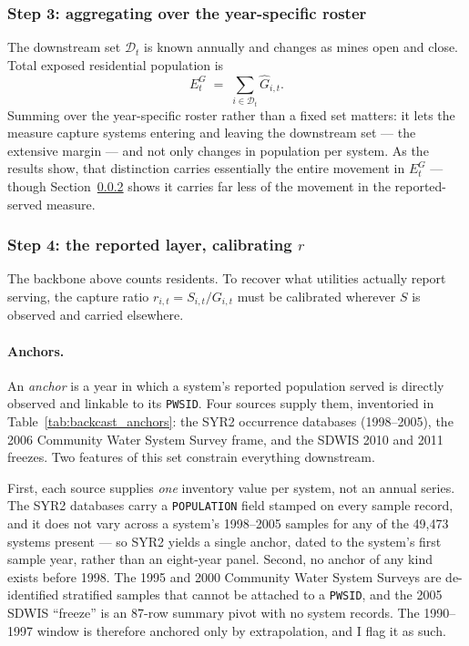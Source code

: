 \subsubsection{Step 3: aggregating over the year-specific roster}

The downstream set $\mathcal{D}_t$ is known annually and changes as mines open
and close. Total exposed residential population is
%
\begin{equation}
E^{G}_t \;=\; \sum_{i\in\mathcal{D}_t} \hat G_{i,t} .
\label{eq:exposure}
\end{equation}
%
Summing over the year-specific roster rather than a fixed set matters: it lets
the measure capture systems entering and leaving the downstream set --- the
extensive margin --- and not only changes in population per system. As the
results show, that distinction carries essentially the entire movement in
$E^{G}_t$ --- though Section~\ref{sec:backcast-step3} shows it carries far less
of the movement in the reported-served measure.

\subsubsection{Step 4: the reported layer, calibrating $r$}
\label{sec:backcast-step3}

The backbone above counts residents. To recover what utilities actually report
serving, the capture ratio $r_{i,t}=S_{i,t}/G_{i,t}$ must be calibrated wherever
$S$ is observed and carried elsewhere.

\paragraph{Anchors.}
An \emph{anchor} is a year in which a system's reported population served is
directly observed and linkable to its \texttt{PWSID}. Four sources supply them,
inventoried in Table~\ref{tab:backcast_anchors}: the SYR2 occurrence databases
(1998--2005), the 2006 Community Water System Survey frame, and the SDWIS 2010
and 2011 freezes. Two features of this set constrain everything downstream.

First, each source supplies \emph{one} inventory value per system, not an annual
series. The SYR2 databases carry a \texttt{POPULATION} field stamped on every
sample record, and it does not vary across a system's 1998--2005 samples for any
of the 49,473 systems present --- so SYR2 yields a single anchor, dated to the
system's first sample year, rather than an eight-year panel. Second, no anchor of
any kind exists before 1998. The 1995 and 2000 Community Water System Surveys are
de-identified stratified samples that cannot be attached to a \texttt{PWSID}, and
the 2005 SDWIS ``freeze'' is an 87-row summary pivot with no system records. The
1990--1997 window is therefore anchored only by extrapolation, and I flag it as
such.


